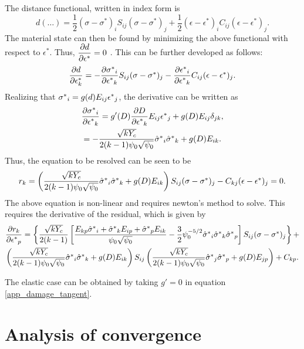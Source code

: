 \documentclass[10pt]{cas-sc}
\begin{document}
The distance functional, written in index form is
\begin{equation}
	d(\dots) = \frac{1}{2}(\sigma-\sigma^*)_i S_{ij} (\sigma-\sigma^*)_j + \frac{1}{2} (\epsilon-\epsilon^*)_i C_{ij} (\epsilon-\epsilon^*)_j.
\end{equation}
The material state can then be found by minimizing the above functional with respect to $\epsilon^*$. Thus, ${\dfrac{\partial d}{\partial \epsilon ^*}}=0$ . This can be further developed as follows:
\begin{equation}
	{\dfrac{\partial d}{\partial \epsilon ^*_k}} = -{\dfrac{\partial \mbox{$\sigma^*$}_i}{\partial \mbox{$\epsilon^*$}_k}} S_{ij} ({\sigma} - \mbox{$\sigma^*$})_j - {\dfrac{\partial \mbox{$\epsilon^*$}_i}{\partial \mbox{$\epsilon^*$}_k}} C_{ij}({\epsilon}-\mbox{$\epsilon^*$})_j.
\end{equation}
Realizing that $\mbox{$\sigma^*$}_i = g(d) E_{ij} \mbox{$\epsilon^*$}_j$, the derivative can be written as 
\begin{gather}
	{\dfrac{\partial  \mbox{$\sigma^*$}_i}{\partial  \mbox{$\epsilon^*$}_k}} = g'(D) {\dfrac{\partial D}{\partial \mbox{$\epsilon^*$}_k}} E_{ij} \mbox{$\epsilon^*$}_j + g(D) E_{ij} \delta_{jk},  \label{app_damage_tangent} \\
	= -\frac{\sqrt{k Y_c}}{2(k-1)\psi_0 \sqrt{\psi_0}} \mbox{$\hat{\sigma}^*$}_i \mbox{$\hat{\sigma}^*$}_k + g(D) E_{ik}.
\end{gather}
Thus, the equation to be resolved can be seen to be
\begin{equation}
	r_k = \left(\frac{\sqrt{k Y_c}}{2(k-1)\psi_0 \sqrt{\psi_0}} \mbox{$\hat{\sigma}^*$}_i \mbox{$\hat{\sigma}^*$}_k + g(D) E_{ik} \right) S_{ij} ({\sigma} - \mbox{$\sigma^*$})_j -  C_{kj}({\epsilon}-\mbox{$\epsilon^*$})_j = 0.\label{app_residual}
\end{equation}
The above equation is non-linear and requires newton's method to solve. This requires the derivative of the residual, which is given by
\begin{multline}
	{\dfrac{\partial r_k}{\partial  \mbox{$\epsilon^*$}_p}} = \left\{  \frac{\sqrt{k Y_c}}{2(k-1)} \left[ \frac{ E_{kp} \mbox{$\hat{\sigma}^*$}_i + \mbox{$\hat{\sigma}^*$}_k E_{ip} + \mbox{$\hat{\sigma}^*$}_p E_{ik} }{\psi_0 \sqrt{\psi_0}}-\frac{3}{2} \psi_0^{-5/2} \mbox{$\hat{\sigma}^*$}_i \mbox{$\hat{\sigma}^*$}_k \mbox{$\hat{\sigma}^*$}_p \right] S_{ij} ({\sigma} - \mbox{$\sigma^*$})_j  \right\} +  \\ 
	\left(\frac{\sqrt{k Y_c}}{2(k-1)\psi_0 \sqrt{\psi_0}} \mbox{$\hat{\sigma}^*$}_i \mbox{$\hat{\sigma}^*$}_k + g(D) E_{ik} \right) S_{ij} \left(\frac{\sqrt{k Y_c}}{2(k-1)\psi_0 \sqrt{\psi_0}} \mbox{$\hat{\sigma}^*$}_j \mbox{$\hat{\sigma}^*$}_p + g(D) E_{jp} \right) + C_{kp}.  \label{app_hessian}
\end{multline}

The elastic case can be obtained by taking $g'=0$ in equation \ref{app_damage_tangent}. 

\section{Analysis of convergence \label{appx_convergence}}
\end{document}
